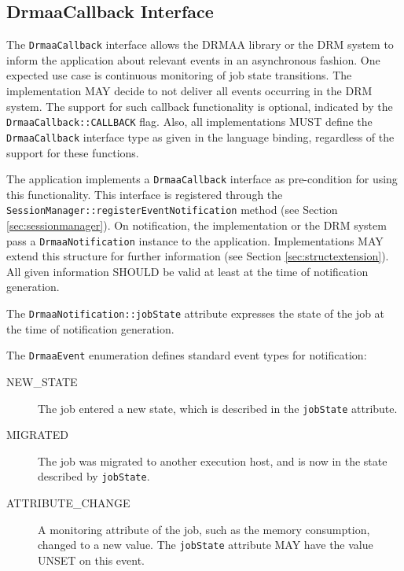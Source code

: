 \documentclass{article}
\newcommand{\h}[1]{\lstinline|#1|}
\begin{document}
\subsection{DrmaaCallback Interface}
\label{sec:drmaacallback}

The \h{DrmaaCallback} interface allows the DRMAA library or the DRM system to inform the application about relevant events in an asynchronous fashion. One expected use case is continuous monitoring of job state transitions. The implementation MAY decide to not deliver all events occurring in the DRM system. The support for such callback functionality is optional, indicated by the \h{DrmaaCallback::CALLBACK} flag. Also, all implementations MUST define the \h{DrmaaCallback} interface type as given in the language binding, regardless of the support for these functions.





The application implements a \h{DrmaaCallback} interface as pre-condition for using this functionality. This interface is registered through the \h{SessionManager::registerEventNotification} method (see Section \ref{sec:sessionmanager}). On notification, the implementation or the DRM system pass a \h{DrmaaNotification} instance to the application. Implementations MAY extend this structure for further information (see Section \ref{sec:structextension}). All given information SHOULD be valid at least at the time of notification generation. 

The \h{DrmaaNotification::jobState} attribute expresses the state of the job at the time of notification generation. 

The \h{DrmaaEvent} enumeration defines standard event types for notification:

\begin{description}
	\item[NEW\_STATE] The job entered a new state, which is described in the \h{jobState} attribute. 
	\item[MIGRATED] The job was migrated to another execution host, and is now in the state described by \h{jobState}.
	\item[ATTRIBUTE\_CHANGE] A monitoring attribute of the job, such as the memory consumption, changed to a new value. The \h{jobState} attribute MAY have the value UNSET on this event.
\end{description}
\end{document}

